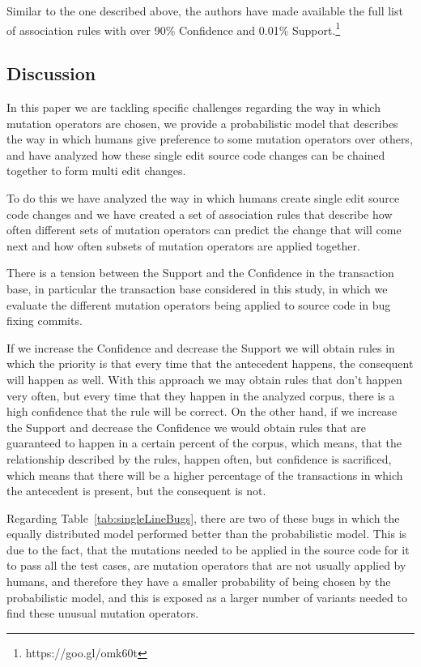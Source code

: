 \documentclass[conference]{IEEEtran}
\begin{document}
Similar to the one described above, the authors have made available the full list of association rules with over 90\% Confidence and 0.01\% Support.\footnote{https://goo.gl/omk60t}

\subsection{Discussion} \label{discussion}

In this paper we are tackling specific 
challenges regarding the way in which mutation operators are chosen, we provide 
a probabilistic model that describes the way in which humans give preference to 
some mutation operators over others, and have analyzed how these single edit 
source code changes can be chained together to form multi edit changes.

To do this we have analyzed the way in which humans create single edit 
source code changes and we have created a set of association rules that describe 
how often different sets of mutation operators can predict the change that will 
come next and how often subsets of mutation operators are applied together.

There is a tension between the Support and the Confidence in the transaction 
base, in particular the transaction base considered in this study, in which we 
evaluate the different mutation operators being applied to source code in bug 
fixing commits. 

If we increase the Confidence and decrease the Support we will obtain rules in 
which the priority is that every time that the antecedent happens, the 
consequent will happen as well. With this approach we may obtain rules that 
don't happen very often, but every time that they happen in the analyzed corpus, 
there is a high confidence that the rule will be correct. On the other hand, if 
we increase the Support and decrease the Confidence we would obtain rules that 
are guaranteed to happen in a certain percent of the corpus, which means, that 
the relationship described by the rules, happen often, but confidence is 
sacrificed, which means that there will be a higher percentage of the 
transactions in which the antecedent is present, but the consequent is not. 

Regarding Table~\ref{tab:singleLineBugs}, there are two of these bugs in which
the equally distributed model performed better than the probabilistic
model. This is due to the fact, that the mutations needed to be applied in the
source code for it to pass all the test cases, are mutation operators that are
not usually applied by humans, and therefore they have a smaller probability of
being chosen by the probabilistic model, and this is exposed as a larger number
of variants needed to find these unusual mutation operators. 
\end{document}
